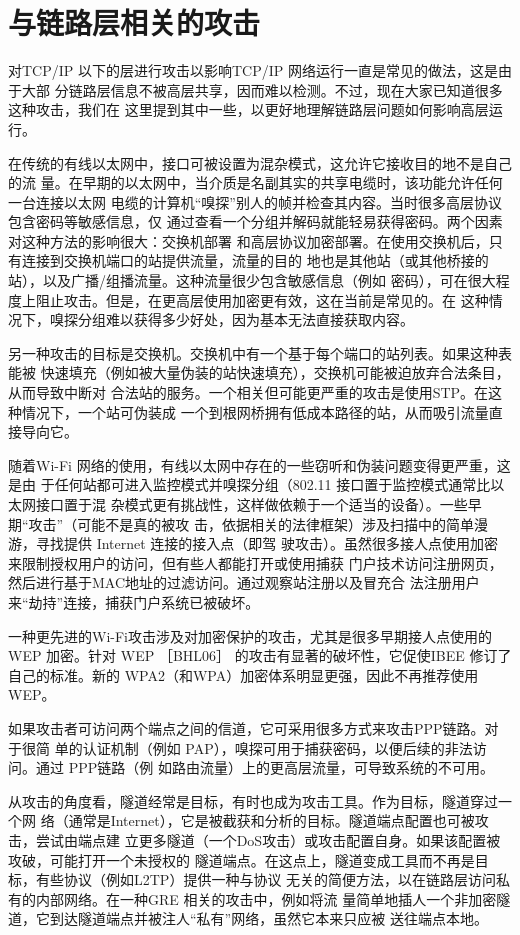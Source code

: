 \section{与链路层相关的攻击}

对TCP/IP 以下的层进行攻击以影响TCP/IP 网络运行一直是常见的做法，这是由于大部
分链路层信息不被高层共享，因而难以检测。不过，现在大家已知道很多这种攻击，我们在
这里提到其中一些，以更好地理解链路层问题如何影响高层运行。

在传统的有线以太网中，接口可被设置为混杂模式，这允许它接收目的地不是自己的流
量。在早期的以太网中，当介质是名副其实的共享电缆时，该功能允许任何一台连接以太网
电缆的计算机“嗅探”别人的帧并检查其内容。当时很多高层协议包含密码等敏感信息，仅
通过查看一个分组并解码就能轻易获得密码。两个因素对这种方法的影响很大：交换机部署
和高层协议加密部署。在使用交换机后，只有连接到交换机端口的站提供流量，流量的目的
地也是其他站（或其他桥接的站），以及广播/组播流量。这种流量很少包含敏感信息（例如
密码），可在很大程度上阻止攻击。但是，在更高层使用加密更有效，这在当前是常见的。在
这种情况下，嗅探分组难以获得多少好处，因为基本无法直接获取内容。

另一种攻击的目标是交换机。交换机中有一个基于每个端口的站列表。如果这种表能被
快速填充（例如被大量伪装的站快速填充），交换机可能被迫放弃合法条目，从而导致中断对
合法站的服务。一个相关但可能更严重的攻击是使用STP。在这种情况下，一个站可伪装成
一个到根网桥拥有低成本路径的站，从而吸引流量直接导向它。

随着Wi-Fi 网络的使用，有线以太网中存在的一些窃听和伪装问题变得更严重，这是由
于任何站都可进入监控模式并嗅探分组（802.11 接口置于监控模式通常比以太网接口置于混
杂模式更有挑战性，这样做依赖于一个适当的设备）。一些早期“攻击”（可能不是真的被攻
击，依据相关的法律框架）涉及扫描中的简单漫游，寻找提供 Internet 连接的接入点（即驾
驶攻击）。虽然很多接人点使用加密来限制授权用户的访问，但有些人都能打开或使用捕获
门户技术访问注册网页，然后进行基于MAC地址的过滤访问。通过观察站注册以及冒充合
法注册用户来“劫持”连接，捕获门户系统已被破坏。

一种更先进的Wi-Fi攻击涉及对加密保护的攻击，尤其是很多早期接人点使用的 WEP
加密。针对 WEP ［BHL06］ 的攻击有显著的破坏性，它促使IBEE 修订了自己的标准。新的
WPA2（和WPA）加密体系明显更强，因此不再推荐使用WEP。

如果攻击者可访问两个端点之间的信道，它可采用很多方式来攻击PPP链路。对于很简
单的认证机制（例如 PAP），嗅探可用于捕获密码，以便后续的非法访问。通过 PPP链路（例
如路由流量）上的更高层流量，可导致系统的不可用。

从攻击的角度看，隧道经常是目标，有时也成为攻击工具。作为目标，隧道穿过一个网
络（通常是Internet），它是被截获和分析的目标。隧道端点配置也可被攻击，尝试由端点建
立更多隧道（一个DoS攻击）或攻击配置自身。如果该配置被攻破，可能打开一个未授权的
隧道端点。在这点上，隧道变成工具而不再是目标，有些协议（例如L2TP）提供一种与协议
无关的简便方法，以在链路层访问私有的内部网络。在一种GRE 相关的攻击中，例如将流
量简单地插人一个非加密隧道，它到达隧道端点并被注人“私有”网络，虽然它本来只应被
送往端点本地。

